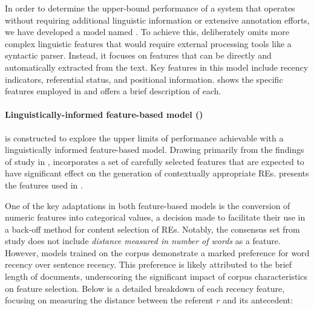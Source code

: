 In order to determine the upper-bound performance of a system that operates without requiring additional linguistic information or extensive annotation efforts, we have developed a model named . To achieve this,  deliberately omits more complex linguistic features that would require external processing tools like a syntactic parser. Instead, it focuses on features that can be directly and automatically extracted from the text. Key features in this model include recency indicators, referential status, and positional information.  shows the specific features employed in  and offers a brief description of each. 



\paragraph*{Linguistically-informed feature-based model ()}

 is constructed to explore the upper limits of performance achievable with a linguistically informed feature-based model. Drawing primarily from the findings of study \studB in ,  incorporates a set of carefully selected features that are expected to have significant effect on the generation of contextually appropriate REs.  presents the features used in .

 

One of the key adaptations in both feature-based models is the conversion of numeric features into categorical values, a decision made to facilitate their use in a back-off method for content selection of REs. Notably, the consensus set from study \studB does not include \emph{distance measured in number of words} as a feature. However, models trained on the \webnlg corpus demonstrate a marked preference for word recency over sentence recency. This preference is likely attributed to the brief length of \webnlg documents, underscoring the significant impact of corpus characteristics on feature selection. Below is a detailed breakdown of each recency feature, focusing on measuring the distance between the referent $r$ and its antecedent:


